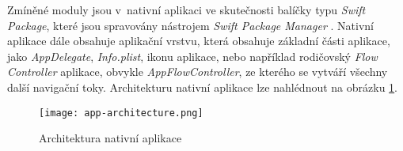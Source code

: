 Zmíněné moduly jsou v~nativní aplikaci ve skutečnosti balíčky typu \emph{Swift Package}, které jsou spravovány nástrojem \emph{Swift Package Manager} \cite{spm}. Nativní aplikace dále obsahuje aplikační vrstvu, která obsahuje základní části aplikace, jako \emph{AppDelegate}, \emph{Info.plist}, ikonu aplikace, nebo například rodičovský \emph{Flow Controller} aplikace, obvykle \emph{AppFlowController}, ze kterého se vytváří všechny další navigační toky. Architekturu nativní aplikace lze nahlédnout na obrázku \ref{fig:app-architecture}.

\begin{figure}[h]
	\centering
	\texttt{[image: app-architecture.png]}
	\caption{Architektura nativní aplikace}
	\label{fig:app-architecture}
\end{figure}





































